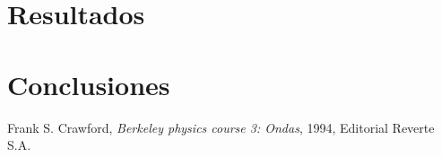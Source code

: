 \documentclass[11pt,a4paper]{article}
\begin{document}

\section{Resultados}
\label{sec:discusion}






\section{Conclusiones}
\label{sec:conclusiones}










\begin{thebibliography}{1}
  Frank S. Crawford, \textit{Berkeley physics course 3: Ondas}, 1994, Editorial Reverte S.A.
\end{thebibliography}
 
\end{document}

